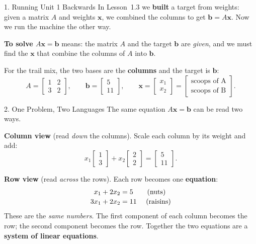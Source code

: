 \documentclass[10pt]{article}
\newcommand{\xx}{\mathbf{x}}
\newcommand{\bb}{\mathbf{b}}
\begin{document}
\begin{notesbox}{1. Running Unit 1 Backwards}
In Lesson~1.3 we \textbf{built} a target from weights: given a matrix $A$ and weights $\xx$, we
combined the columns to get $\bb = A\xx$. Now we run the machine the other way.

\vspace{2pt}
\textbf{To solve $A\xx=\bb$} means: the matrix $A$ and the target $\bb$ are \emph{given}, and we
must find the  $\xx$ that combine the columns of $A$ into $\bb$.

\vspace{4pt}
For the trail mix, the two bases are the \textbf{columns} and the target is $\bb$:
\[
  A = \begin{bmatrix} 1 & 2 \\ 3 & 2 \end{bmatrix}, \qquad
  \bb = \begin{bmatrix} 5 \\ 11 \end{bmatrix}, \qquad
  \xx = \begin{bmatrix} x_1 \\ x_2 \end{bmatrix}
      = \begin{bmatrix} \text{scoops of A} \\ \text{scoops of B} \end{bmatrix}.
\]
\end{notesbox}

\begin{notesbox}{2. One Problem, Two Languages}
The same equation $A\xx=\bb$ can be read two ways.

\vspace{3pt}
\textbf{Column view} (read \emph{down} the columns). Scale each column by its weight and add:
\[
  x_1\begin{bmatrix} 1 \\ 3 \end{bmatrix} + x_2\begin{bmatrix} 2 \\ 2 \end{bmatrix}
  = \begin{bmatrix} 5 \\ 11 \end{bmatrix}.
\]

\textbf{Row view} (read \emph{across} the rows). Each row becomes one \textbf{equation}:
\[
  \begin{array}{r@{}c@{}l}
    x_1 &{}+ 2x_2 ={}& 5 \qquad (\text{nuts})\\[2pt]
    3x_1 &{}+ 2x_2 ={}& 11 \quad\ (\text{raisins})
  \end{array}
\]
These are the \emph{same numbers}. The first component of each column becomes the 
row; the second component becomes the  row. Together the two equations are a
\textbf{system of linear equations}.
\end{notesbox}
\end{document}
